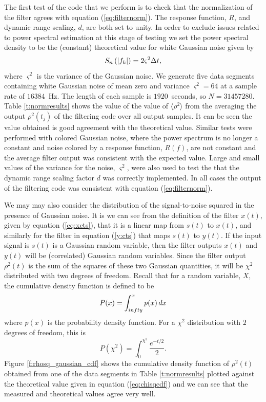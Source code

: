 The first test of the code that we perform is to check that the normalization
of the filter agrees with equation (\ref{eq:filternorm}). The response
function, $R$, and dynamic range scaling, $d$, are both set to unity. In order
to exclude issues related to power spectral estimation at this stage of
testing  we set the power spectral density to be the (constant) theoretical
value for white Gaussian noise given by
\begin{equation}
S_n\left(\left|f_{k}\right|\right) = 2 \varsigma^2 \Delta t,
\label{eq:gaussianpsd}
\end{equation}
where $\varsigma^2$ is the variance of the Gaussian noise.  We generate five
data segments containing white Gaussian noise of mean zero and variance
$\varsigma^2 = 64$ at a sample rate of $16384$~Hz. The length of each sample is
$1920$~seconds, so $N = 31457280$. Table \ref{t:normresults} shows the value
of the value of $\langle \rho^2 \rangle$ from the averaging the output
$\rho^2(t_j)$ of the filtering code over all output samples. It can be seen
the value obtained is good agreement with the theoretical value.  Similar
tests were performed with colored Gaussian noise, where the power spectrum is
no longer a constant and noise colored by a response function, $R(f)$, are not
constant and the average filter output was consistent with the expected value.
Large and small values of the variance for the noise, $\varsigma^2$, were also
used to test the that the dynamic range scaling factor $d$ was correctly
implemented. In all cases the output of the filtering code was consistent with
equation (\ref{eq:filternorm}).

We may may also consider the distribution of the signal-to-noise squared in
the presence of Gaussian noise. It is we can see from the definition of the
filter $x(t)$, given by equation (\ref{eq:xcts}), that it is a linear map from
$s(t)$ to $x(t)$, and similarly for the filter in equation (\ref{y:cts}) that
maps $s(t)$ to $y(t)$. If the input signal is $s(t)$ is a Gaussian random
variable, then the filter outputs $x(t)$ and $y(t)$ will be (correlated)
Gaussian random variables. Since the filter output $\rho^2(t)$ is the sum of
the squares of these two Gaussian quantities, it will be $\chi^2$ distributed
with two degrees of freedom. Recall that for a random variable, $X$, the
cumulative density function is defined to be
\begin{equation}
P(x) = \int_{\-infty}^x p(x)\, dx
\end{equation}
where $p(x)$ is the probability density function. For a $\chi^2$ distribution
with $2$ degrees of freedom, this is
\begin{equation}
P(\chi^2) = \int_0^{\chi^2} \frac{e^{-t/2}}{2}.
\label{eq:chisqcdf}
\end{equation}
Figure \ref{f:rhosq_gaussian_cdf} shows the cumulative density function of
$\rho^2(t)$ obtained from one of the data segments in Table
\ref{t:normresults} plotted against the theoretical value given in equation
(\ref{eq:chisqcdf}) and we can see that the measured and theoretical values
agree very well.

